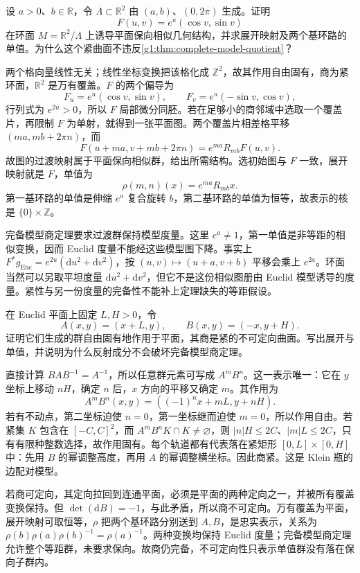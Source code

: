 \begin{exercise}
	\label{g1:ex:spiral-similarity-torus}
	设 \(a>0\)、\(b\in\mathbb R\)，令 \(\Lambda\subset\mathbb R^2\) 由 \((a,b)\)、\((0,2\pi)\) 生成。证明
	\[
		F(u,v)=e^u(\cos v,\sin v)
	\]
	在环面 \(M=\mathbb R^2/\Lambda\) 上诱导平面保向相似几何结构，并求展开映射及两个基环路的单值。为什么这个紧曲面不违反\cref{g1:thm:complete-model-quotient}？
\end{exercise}
\begin{solution}
	两个格向量线性无关；线性坐标变换把该格化成 \(\mathbb Z^2\)，故其作用自由固有，商为紧环面，\(\mathbb R^2\) 是万有覆盖。\(F\) 的两个偏导为
	\[
		F_u=e^u(\cos v,\sin v),\qquad F_v=e^u(-\sin v,\cos v),
	\]
	行列式为 \(e^{2u}>0\)，所以 \(F\) 局部微分同胚。若在足够小的商邻域中选取一个覆盖片，再限制 \(F\) 为单射，就得到一张平面图。两个覆盖片相差格平移 \((ma,mb+2\pi n)\)，而
	\[
		F(u+ma,v+mb+2\pi n)=e^{ma}R_{mb}F(u,v).
	\]
	故图的过渡映射属于平面保向相似群，给出所需结构。选初始图与 \(F\) 一致，展开映射就是 \(F\)，单值为
	\[
		\rho(m,n)(x)=e^{ma}R_{mb}x.
	\]
	第一基环路的单值是伸缩 \(e^a\) 复合旋转 \(b\)，第二基环路的单值为恒等，故表示的核是 \(\{0\}\times\mathbb Z\)。

	完备模型商定理要求过渡群保持模型度量。这里 \(e^a\ne1\)，第一单值是非等距的相似变换，因而 Euclid 度量不能经这些模型图下降。事实上 \(F^*g_{\mathrm{Euc}}=e^{2u}(\mathrm{d}u^2+\mathrm{d}v^2)\)，按 \((u,v)\mapsto(u+a,v+b)\) 平移会乘上 \(e^{2a}\)。环面当然可以另取平坦度量 \(\mathrm{d}u^2+\mathrm{d}v^2\)，但它不是这份相似图册由 Euclid 模型诱导的度量。紧性与另一份度量的完备性不能补上定理缺失的等距假设。
\end{solution}

\begin{exercise}
	\label{g1:ex:klein-geometric-holonomy}
	在 Euclid 平面上固定 \(L,H>0\)，令
	\[
		A(x,y)=(x+L,y),\qquad B(x,y)=(-x,y+H).
	\]
	证明它们生成的群自由固有地作用于平面，其商是紧的不可定向曲面。写出展开与单值，并说明为什么反射成分不会破坏完备模型商定理。
\end{exercise}
\begin{solution}
	直接计算 \(BAB^{-1}=A^{-1}\)，所以任意群元素可写成 \(A^mB^n\)。这一表示唯一：它在 \(y\) 坐标上移动 \(nH\)，确定 \(n\) 后，\(x\) 方向的平移又确定 \(m\)。其作用为
	\[
		A^mB^n(x,y)=((-1)^n x+mL,y+nH).
	\]
	若有不动点，第二坐标迫使 \(n=0\)，第一坐标继而迫使 \(m=0\)，所以作用自由。若紧集 \(K\) 包含在 \([-C,C]^2\)，而 \(A^mB^nK\cap K\ne\varnothing\)，则 \(|n|H\le2C\)、\(|m|L\le2C\)，只有有限种整数选择，故作用固有。每个轨道都有代表落在紧矩形 \([0,L]\times[0,H]\) 中：先用 \(B\) 的幂调整高度，再用 \(A\) 的幂调整横坐标。因此商紧。这是 Klein 瓶的边配对模型。

	若商可定向，其定向拉回到连通平面，必须是平面的两种定向之一，并被所有覆盖变换保持。但 \(\det(\mathrm{d}B)=-1\)，与此矛盾，所以商不可定向。万有覆盖为平面，展开映射可取恒等，\(\rho\) 把两个基环路分别送到 \(A,B\)，是忠实表示，关系为 \(\rho(b)\rho(a)\rho(b)^{-1}=\rho(a)^{-1}\)。两种变换均保持 Euclid 度量；完备模型商定理允许整个等距群，未要求保向。故商仍完备，不可定向性只表示单值群没有落在保向子群内。
\end{solution}

